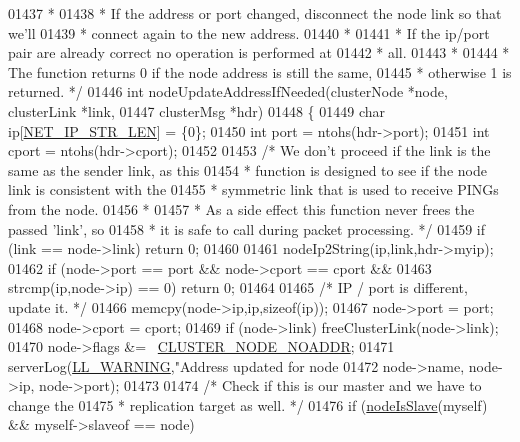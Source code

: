 \begin{DoxyCode}
{{{{{{{{{{{{{{{{{{{{01437 \textcolor{comment}{ *}
01438 \textcolor{comment}{ * If the address or port changed, disconnect the node link so that we'll}
01439 \textcolor{comment}{ * connect again to the new address.}
01440 \textcolor{comment}{ *}
01441 \textcolor{comment}{ * If the ip/port pair are already correct no operation is performed at}
01442 \textcolor{comment}{ * all.}
01443 \textcolor{comment}{ *}
01444 \textcolor{comment}{ * The function returns 0 if the node address is still the same,}
01445 \textcolor{comment}{ * otherwise 1 is returned. */}
01446 \textcolor{keywordtype}{int} nodeUpdateAddressIfNeeded(clusterNode *node, clusterLink *link,
01447                               clusterMsg *hdr)
01448 \{
01449     \textcolor{keywordtype}{char} ip[\hyperlink{server_8h_ad97c5405ed22a94e9fcc10fba577d6c0}{NET\_IP\_STR\_LEN}] = \{0\};
01450     \textcolor{keywordtype}{int} port = ntohs(hdr->port);
01451     \textcolor{keywordtype}{int} cport = ntohs(hdr->cport);
01452 
01453     \textcolor{comment}{/* We don't proceed if the link is the same as the sender link, as this}
01454 \textcolor{comment}{     * function is designed to see if the node link is consistent with the}
01455 \textcolor{comment}{     * symmetric link that is used to receive PINGs from the node.}
01456 \textcolor{comment}{     *}
01457 \textcolor{comment}{     * As a side effect this function never frees the passed 'link', so}
01458 \textcolor{comment}{     * it is safe to call during packet processing. */}
01459     \textcolor{keywordflow}{if} (link == node->link) \textcolor{keywordflow}{return} 0;
01460 
01461     nodeIp2String(ip,link,hdr->myip);
01462     \textcolor{keywordflow}{if} (node->port == port && node->cport == cport &&
01463         strcmp(ip,node->ip) == 0) \textcolor{keywordflow}{return} 0;
01464 
01465     \textcolor{comment}{/* IP / port is different, update it. */}
01466     memcpy(node->ip,ip,\textcolor{keyword}{sizeof}(ip));
01467     node->port = port;
01468     node->cport = cport;
01469     \textcolor{keywordflow}{if} (node->link) freeClusterLink(node->link);
01470     node->flags &= ~\hyperlink{cluster_8h_a2bbed8bf0615871a01ca8b7f691b56d8}{CLUSTER\_NODE\_NOADDR};
01471     serverLog(\hyperlink{server_8h_a31229b9334bba7d6be2a72970967a14b}{LL\_WARNING},\textcolor{stringliteral}{"Address updated for node %
01472         node->name, node->ip, node->port);
01473 
01474     \textcolor{comment}{/* Check if this is our master and we have to change the}
01475 \textcolor{comment}{     * replication target as well. */}
01476     \textcolor{keywordflow}{if} (\hyperlink{cluster_8h_a3c99881f6892130c902b42b1f84a0e11}{nodeIsSlave}(myself) && myself->slaveof == node)
}}}}}}}}}}}}}}}}}}}}}
\end{DoxyCode}
